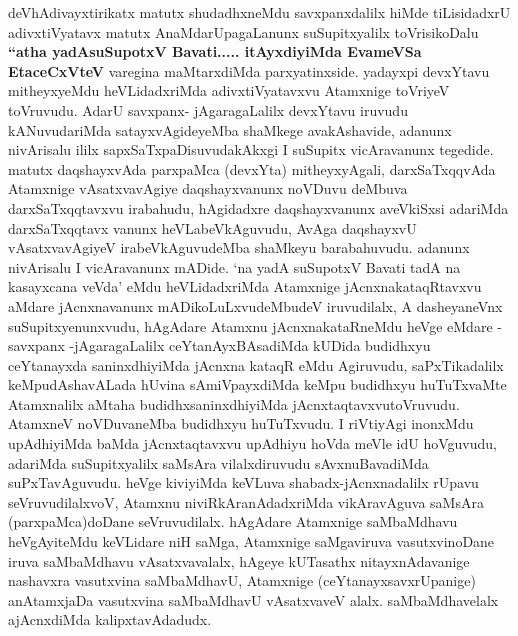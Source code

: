 \centerline{}

\begin{artha}
deVhAdivayxtirikatx matutx shudadhxneMdu savxpanxdalilx hiMde
tiLisidadxrU adivxtiVyatavx matutx AnaMdarUpagaLanunx
suSupitxyalilx toVrisikoDalu \textbf{``atha yadAsuSupotxV Bavati..... itAyxdiyiMda EvameVSa EtaceCxVteV} varegina maMtarxdiMda parxyatinxside. yadayxpi devxYtavu mitheyxyeMdu heVLidadxriMda
adivxtiVyatavxvu Atamxnige toVriyeV toVruvudu. AdarU savxpanx-
jAgaragaLalilx devxYtavu iruvudu kANuvudariMda satayxvAgideyeMba
shaMkege avakAshavide, adanunx nivArisalu ililx
sapxSaTxpaDisuvudakAkxgi I suSupitx vicAravanunx tegedide. matutx
daqshayxvAda parxpaMca  (devxYta) mitheyxyAgali, darxSaTxqqvAda Atamxnige
vAsatxvavAgiye daqshayxvanunx noVDuvu deMbuva darxSaTxqqtavxvu
irabahudu, hAgidadxre daqshayxvanunx aveVkiSxsi adariMda
darxSaTxqqtavx	vanunx heVLabeVkAguvudu, AvAga daqshayxvU
vAsatxvavAgiyeV irabeVkAguvudeMba shaMkeyu barabahuvudu. adanunx
nivArisalu I vicAravanunx mADide. `na yadA suSupotxV Bavati tadA na kasayxcana veVda' eMdu heVLidadxriMda Atamxnige
jAcnxnakataqRtavxvu aMdare jAcnxnavanunx mADikoLuLxvudeMbudeV
iruvudilalx, A dasheyaneVnx suSupitxyenunxvudu, hAgAdare Atamxnu
jAcnxnakataRneMdu heVge eMdare - savxpanx -\break jAgaragaLalilx
ceYtanAyxBAsadiMda kUDida budidhxyu ceYtanayxda saninxdhiyiMda jAcnxna
kataqR eMdu Agiruvudu, saPxTikadalilx keMpudAshavALada hUvina
sAmiVpayxdiMda keMpu budidhxyu huTuTxvaMte Atamxnalilx aMtaha
budidhxsaninxdhiyiMda jAcnxtaqtavxvutoVruvudu. AtamxneV noVDuvaneMba
budidhxyu huTuTxvudu. I riVtiyAgi inonxMdu upAdhiyiMda baMda
jAcnxtaqtavxvu upAdhiyu hoVda meVle idU hoVguvudu, adariMda
suSupitxyalilx saMsAra vilalxdiruvudu sAvxnuBavadiMda
suPxTavAguvudu. heVge kiviyiMda keVLuva shabadx-jAcnxnadalilx rUpavu
seVruvudilalxvoV, Atamxnu niviRkAranAdadxriMda vikAravAguva saMsAra
(parxpaMca)doDane seVruvudilalx. hAgAdare Atamxnige saMbaMdhavu
heVgAyiteMdu keVLidare niH saMga, Atamxnige saMgaviruva
vasutxvinoDane iruva saMbaMdhavu vAsatxvavalalx, hAgeye kUTasathx
nitayxnAdavanige nashavxra vasutxvina saMbaMdhavU, Atamxnige
(ceYtanayxsavxrUpanige) anAtamxjaDa vasutxvina saMbaMdhavU
vAsatxvaveV alalx. saMbaMdhavelalx ajAcnxdiMda kalipxtavAdadudx.
\end{artha}


